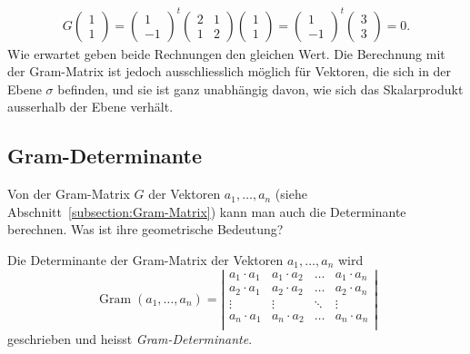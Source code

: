 \begin{beispiel}
\begin{align*}
G
\begin{pmatrix}1\\1\end{pmatrix}
=
\begin{pmatrix}1\\-1\end{pmatrix}^t
\begin{pmatrix}2&1\\1&2\end{pmatrix}
\begin{pmatrix}1\\1\end{pmatrix}
=
\begin{pmatrix}1\\-1\end{pmatrix}^t
\begin{pmatrix}3\\3\end{pmatrix}
=
0.
\end{align*}
Wie erwartet geben beide Rechnungen den gleichen Wert.
Die Berechnung mit der Gram-Matrix ist jedoch ausschliesslich möglich für
Vektoren, die sich in der Ebene $\sigma$ befinden, und sie ist ganz
unabhängig davon, wie sich das Skalarprodukt ausserhalb der Ebene verhält.
\end{beispiel}

\subsection{Gram-Determinante\label{subsection:Gram-Determinante}}
Von der Gram-Matrix $G$ der Vektoren $a_1,\dots,a_n$
(siehe Abschnitt~\ref{subsection:Gram-Matrix})
kann man auch die Determinante berechnen.
Was ist ihre geometrische Bedeutung?

\begin{definition}
Die Determinante der Gram-Matrix der Vektoren $a_1,\dots,a_n$ wird 
\[
\operatorname{Gram}(a_1,\dots,a_n)
=
\left|
\begin{matrix}
a_1\cdot a_1& a_1\cdot a_2&\dots  &a_1\cdot a_n\\
a_2\cdot a_1& a_2\cdot a_2&\dots  &a_2\cdot a_n\\
\vdots      &\vdots       &\ddots &\vdots      \\
a_n\cdot a_1& a_n\cdot a_2&\dots  &a_n\cdot a_n\\
\end{matrix}
\right|
\]
geschrieben und heisst {\em Gram-Determinante}.
%
\end{definition}

